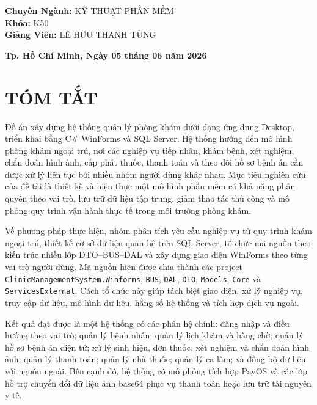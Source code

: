 \documentclass[12pt,a4paper]{article}
\numberwithin{figure}{subsection}
\numberwithin{table}{subsection}
\begin{document}
\begin{titlepage}
\begin{flushleft}
\hspace{3.5cm} \textbf{Chuyên Ngành:} \textcolor{uehred}{KỸ THUẬT PHẦN MỀM} \\[0.1cm]
\hspace{3.5cm} \textbf{Khóa:} \textcolor{uehred}{K50} \\[0.8cm]
\hspace{3.5cm} \textbf{Giảng Viên:} LÊ HỮU THANH TÙNG
\end{flushleft}

\vfill
{\bfseries \small Tp. Hồ Chí Minh, Ngày 05 tháng 06 năm 2026}
\end{titlepage}

\newpage
\tableofcontents
\thispagestyle{empty}

\newpage
\thispagestyle{empty}

\section*{TÓM TẮT}
{}

Đồ án xây dựng hệ thống quản lý phòng khám dưới dạng ứng dụng Desktop, triển khai bằng C\# WinForms và SQL Server. Hệ thống hướng đến mô hình phòng khám ngoại trú, nơi các nghiệp vụ tiếp nhận, khám bệnh, xét nghiệm, chẩn đoán hình ảnh, cấp phát thuốc, thanh toán và theo dõi hồ sơ bệnh án cần được xử lý liên tục bởi nhiều nhóm người dùng khác nhau. Mục tiêu nghiên cứu của đề tài là thiết kế và hiện thực một mô hình phần mềm có khả năng phân quyền theo vai trò, lưu trữ dữ liệu tập trung, giảm thao tác thủ công và mô phỏng quy trình vận hành thực tế trong môi trường phòng khám.

Về phương pháp thực hiện, nhóm phân tích yêu cầu nghiệp vụ từ quy trình khám ngoại trú, thiết kế cơ sở dữ liệu quan hệ trên SQL Server, tổ chức mã nguồn theo kiến trúc nhiều lớp DTO--BUS--DAL và xây dựng giao diện WinForms theo từng vai trò người dùng. Mã nguồn hiện được chia thành các project \texttt{ClinicManagementSystem.Winforms}, \texttt{BUS}, \texttt{DAL}, \texttt{DTO}, \texttt{Models}, \texttt{Core} và \texttt{ServicesExternal}. Cách tổ chức này giúp tách biệt giao diện, xử lý nghiệp vụ, truy cập dữ liệu, mô hình dữ liệu, hằng số hệ thống và tích hợp dịch vụ ngoài.

Kết quả đạt được là một hệ thống có các phân hệ chính: đăng nhập và điều hướng theo vai trò; quản lý bệnh nhân; quản lý lịch khám và hàng chờ; quản lý hồ sơ bệnh án điện tử; xử lý sinh hiệu, đơn thuốc, xét nghiệm và chẩn đoán hình ảnh; quản lý thanh toán; quản lý nhà thuốc; quản lý ca làm; và đồng bộ dữ liệu với nguồn ngoài. Bên cạnh đó, hệ thống có mô phỏng tích hợp PayOS và các lớp hỗ trợ chuyển đổi dữ liệu ảnh base64 phục vụ thanh toán hoặc lưu trữ tài nguyên y tế.
\end{document}
